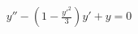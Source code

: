 \documentclass[preview]{standalone}
\begin{document}
\begin{align*}
y''-(1-\frac{y'^2}{3})y'+y=0
\end{align*}
\end{document}
